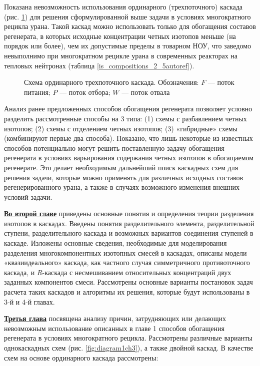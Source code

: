 Показана невозможность использования ординарного (трехпоточного) каскада (рис. \ref{ordinary}) для решения сформулированной выше задачи в условиях многократного рецикла урана. Такой каскад можно использовать только для обогащения составов регенерата, в которых исходные концентрации четных изотопов меньше (на порядок или более), чем их допустимые пределы в товарном НОУ, что заведомо невыполнимо при многократном рецикле урана в современных реакторах на тепловых нейтронах (таблица \ref{is_compositions_2_5autoref}).

\begin{figure}[ht]
  \caption{Схема ординарного трехпоточного каскада. Обозначения: $F$ --- поток питания; $P$ --- поток отбора; $W$ --- поток отвала}\label{ordinary}
\end{figure}

Анализ ранее предложенных способов обогащения регенерата позволяет условно разделить рассмотренные способы на 3 типа: (1) схемы с разбавлением четных изотопов; (2) схемы с отделением четных изотопов; (3) «гибридные» схемы (комбинируют первые два способа).
Показано, что лишь некоторые из известных способов потенциально могут решить поставленную задачу обогащения регенерата в условиях варьирования содержания четных изотопов в обогащаемом регенерате. Это делает необходимым дальнейший поиск каскадных схем для решения задачи, которые можно применять для различных исходных составов регенерированного урана, а также в случаях возможного изменения внешних условий задачи. 

\underline{\textbf{Во второй главе}} приведены основные понятия и определения теории разделения изотопов в каскадах. Введены понятия  разделительного элемента, разделительной ступени, разделительного каскада и возможных вариантов соединения ступеней в каскаде. Изложены основные сведения, необходимые для моделирования разделения многокомпонентных изотопных смесей в каскадах, описаны модели «квазиидеального» каскада, как частного случая симметричного противоточного каскада, и $R$-каскада с несмешиванием относительных концентраций двух заданных компонентов смеси. Рассмотрены основные варианты постановок задач расчета таких каскадов и алгоритмы их решения, которые будут использованы в 3-й и 4-й главах. 

\underline{\textbf{Третья глава}} посвящена анализу причин, затрудняющих или делающих невозможным использование описанных в главе 1 способов обогащения регенерата в условиях многократного рецикла. Рассмотрены различные варианты однокаскадных схем (рис. \ref{fig:diagram1ch3}), а также двойной каскад. В качестве схем на основе ординарного каскада рассмотрены:

